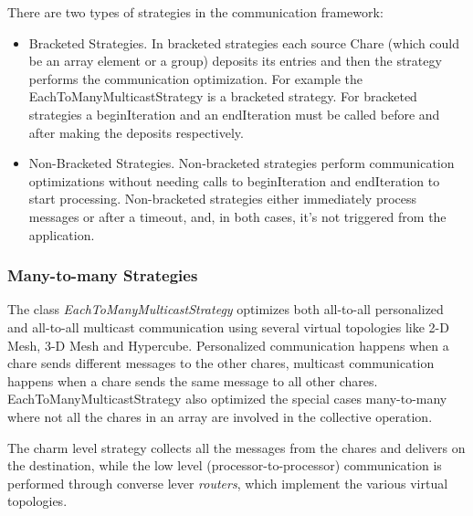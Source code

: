 {There are two types of strategies in the communication framework:

\begin{itemize}

\item Bracketed Strategies. In bracketed strategies each source Chare
(which could be an array element or a group) deposits its entries and then the
strategy performs the communication optimization. For example the
EachToManyMulticastStrategy is a bracketed strategy. For bracketed strategies a
beginIteration and an endIteration must be called before and after making the
deposits respectively.

\item Non-Bracketed Strategies. Non-bracketed strategies perform communication
optimizations without needing calls to beginIteration and endIteration to start
processing. Non-bracketed strategies either immediately process messages or
after a timeout, and, in both cases, it's not triggered from the application.

\end{itemize}

\subsubsection{Many-to-many Strategies}

The class {\em EachToManyMulticastStrategy} optimizes both all-to-all
personalized and all-to-all multicast communication using several virtual
topologies like 2-D Mesh, 3-D Mesh and Hypercube. Personalized communication
happens when a chare sends different messages to the other chares, multicast
communication happens when a chare sends the same message to all other chares.
EachToManyMulticastStrategy also optimized the special cases many-to-many where
not all the chares in an array are involved in the collective operation.

The charm level strategy collects all the messages from the chares and delivers
on the destination, while the low level (processor-to-processor) communication
is performed through converse lever {\em routers}, which implement the various
virtual topologies.


}
